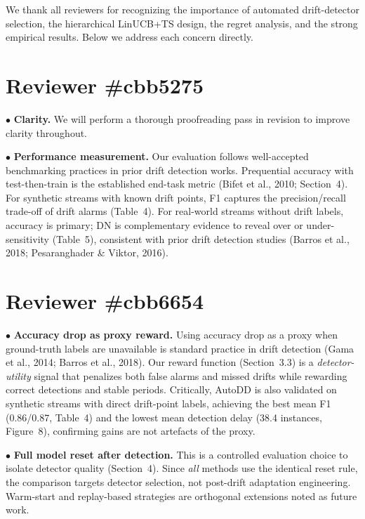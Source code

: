 \documentclass{article}
\begin{document}

We thank all reviewers for recognizing the importance of automated drift-detector selection, the hierarchical LinUCB+TS design, the regret analysis, and the strong empirical results. Below we address each concern directly.

\section*{Reviewer \#cbb5275}

\noindent$\bullet$ \textbf{Clarity.}
We will perform a thorough proofreading pass in revision to improve clarity throughout.

\noindent$\bullet$ \textbf{Performance measurement.}
Our evaluation follows well-accepted benchmarking practices in prior drift detection works. Prequential accuracy with test-then-train is the established end-task metric (Bifet et al., 2010; Section~4). For synthetic streams with known drift points, F1 captures the precision/recall trade-off of drift alarms (Table~4). For real-world streams without drift labels, accuracy is primary; DN is complementary evidence to reveal over or under-sensitivity (Table~5), consistent with prior drift detection studies (Barros et al., 2018; Pesaranghader \& Viktor, 2016).

\section*{Reviewer \#cbb6654}

\noindent$\bullet$ \textbf{Accuracy drop as proxy reward.}
Using accuracy drop as a proxy when ground-truth labels are unavailable is standard practice in drift detection (Gama et al., 2014; Barros et al., 2018). Our reward function (Section~3.3) is a \emph{detector-utility} signal that penalizes both false alarms and missed drifts while rewarding correct detections and stable periods. Critically, AutoDD is also validated on synthetic streams with direct drift-point labels, achieving the best mean F1 (0.86/0.87, Table~4) and the lowest mean detection delay (38.4 instances, Figure~8), confirming gains are not artefacts of the proxy.

\noindent$\bullet$ \textbf{Full model reset after detection.}
This is a controlled evaluation choice to isolate detector quality (Section~4). Since \emph{all} methods use the identical reset rule, the comparison targets detector selection, not post-drift adaptation engineering. Warm-start and replay-based strategies are orthogonal extensions noted as future work.
\end{document}
